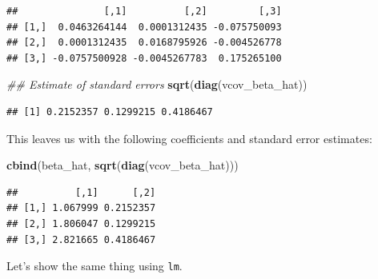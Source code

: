 \documentclass[]{article}
\newenvironment{Shaded}{\begin{snugshade}}{\end{snugshade}}
\newcommand{\CommentTok}[1]{\textcolor[rgb]{0.56,0.35,0.01}{\textit{#1}}}
\newcommand{\DecValTok}[1]{\textcolor[rgb]{0.00,0.00,0.81}{#1}}
\newcommand{\KeywordTok}[1]{\textcolor[rgb]{0.13,0.29,0.53}{\textbf{#1}}}
\newcommand{\NormalTok}[1]{#1}
\newcommand{\OperatorTok}[1]{\textcolor[rgb]{0.81,0.36,0.00}{\textbf{#1}}}
\newcommand{\StringTok}[1]{\textcolor[rgb]{0.31,0.60,0.02}{#1}}
\begin{document}
\begin{Shaded}
\end{Shaded}

\begin{verbatim}
##               [,1]          [,2]         [,3]
## [1,]  0.0463264144  0.0001312435 -0.075750093
## [2,]  0.0001312435  0.0168795926 -0.004526778
## [3,] -0.0757500928 -0.0045267783  0.175265100
\end{verbatim}

\begin{Shaded}
\begin{Highlighting}[]
\CommentTok{## Estimate of standard errors}
\KeywordTok{sqrt}\NormalTok{(}\KeywordTok{diag}\NormalTok{(vcov_beta_hat))}
\end{Highlighting}
\end{Shaded}

\begin{verbatim}
## [1] 0.2152357 0.1299215 0.4186467
\end{verbatim}

This leaves us with the following coefficients and standard error
estimates:

\begin{Shaded}
\begin{Highlighting}[]
\KeywordTok{cbind}\NormalTok{(beta_hat, }\KeywordTok{sqrt}\NormalTok{(}\KeywordTok{diag}\NormalTok{(vcov_beta_hat)))}
\end{Highlighting}
\end{Shaded}

\begin{verbatim}
##          [,1]      [,2]
## [1,] 1.067999 0.2152357
## [2,] 1.806047 0.1299215
## [3,] 2.821665 0.4186467
\end{verbatim}

Let's show the same thing using \texttt{lm}.

\begin{Shaded}
\end{Shaded}
\end{document}
